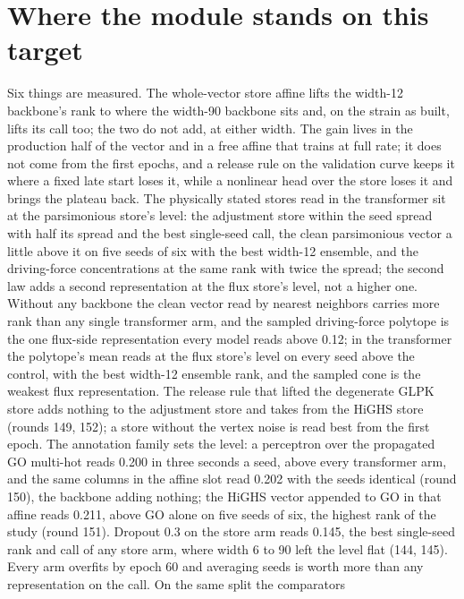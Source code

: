 \section{Where the module stands on this target}
\label{sec:standing}

Six things are measured. The whole-vector store affine lifts the width-12 backbone's
rank to where the width-90 backbone sits and, on the strain as built, lifts its call
too; the two do not add, at either width. The gain lives in the production half of the
vector and in a free affine that trains at full rate; it does not come from the first
epochs, and a release rule on the validation curve keeps it where a fixed late start
loses it, while a nonlinear head over the store loses it and brings the plateau back.
The physically stated stores read in the transformer sit at the parsimonious store's
level: the adjustment store within the seed spread with half its spread and the best
single-seed call, the clean parsimonious vector a little above it on five seeds of six
with the best width-12 ensemble, and the driving-force concentrations at the same rank
with twice the spread; the second law adds a second representation at the flux store's
level, not a higher one. Without any backbone the clean vector read by nearest
neighbors carries more rank than any single transformer arm, and the sampled
driving-force polytope is the one flux-side representation every model reads above
0.12; in the transformer the polytope's mean reads at the flux store's level on every
seed above the control, with the best width-12 ensemble rank, and the sampled cone is
the weakest flux representation. The release rule that lifted the degenerate GLPK
store adds nothing to the adjustment store and takes from the HiGHS store (rounds 149,
152); a store without the vertex noise is read best from the first epoch. The
annotation family sets the level: a perceptron over the propagated GO multi-hot reads
0.200 in three seconds a seed, above every transformer arm, and the same columns in the
affine slot read 0.202 with the seeds identical (round 150), the backbone adding
nothing; the HiGHS vector appended to GO in that affine reads 0.211, above GO alone on
five seeds of six, the highest rank of the study (round 151). Dropout 0.3 on the store
arm reads 0.145, the best single-seed rank and call of any store arm, where width 6 to
90 left the level flat (144, 145). Every arm overfits by epoch 60 and averaging seeds
is worth more than any representation on the call. On the same split the comparators
